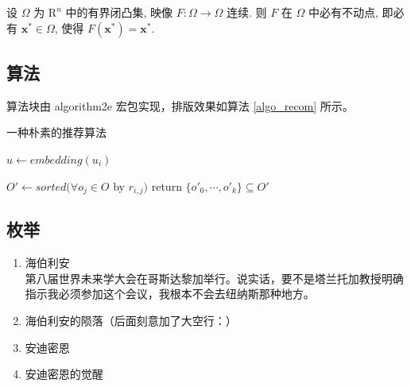 \documentclass[12]{ctexart}
\begin{document}
\begin{corollary}
设 \(\Omega\) 为 \(\mathrm{R}^n\) 中的有界闭凸集, 映像 \(F:\Omega\to \Omega\) 连续. 则 \(F\) 在 \(\Omega\) 中必有不动点, 即必有 \(\boldsymbol{x}^*\in \Omega\), 使得 \(F \left(\boldsymbol{x}^*\right)=\boldsymbol{x}^*\).
\end{corollary}

\subsection{算法 \label{knn} }

算法块由 algorithm2e 宏包\cite{algorithm2e}实现，排版效果如算法 \ref{algo_recom} 所示。

\begin{algorithm}[H]
    \caption{一种朴素的推荐算法}
    \label{algo_recom}



    $u \leftarrow embedding(u_i)$\;


    $O' \leftarrow sorted(\forall o_j \in O$ by $r_{i,j})$\;
    return $\{o'_0, \cdots, o'_k\} \subseteq  O'$\;
\end{algorithm}

\subsection{枚举}

\begin{enumerate}
    \item 海伯利安\\
    第八届世界未来学大会在哥斯达黎加举行。说实话，要不是塔兰托加教授明确指示我必须参加这个会议，我根本不会去纽纳斯那种地方。

    \item 海伯利安的陨落（后面刻意加了大空行：）\\

    \item 安迪密恩

    \item 安迪密恩的觉醒

\end{enumerate}
\end{document}

